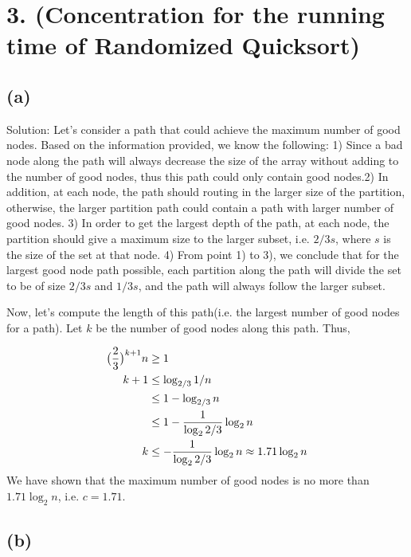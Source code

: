 \documentclass[11pt]{537homework}
\author{Peilun Dai}
\begin{document}
\section*{3. (Concentration for the running time of Randomized Quicksort) }



\subsection*{(a)}

Solution: Let's consider a path that could achieve the maximum number of good nodes. Based on the information provided, we know the following: 1) Since a bad node along the path will always decrease the size of the array without adding to the number of good nodes, thus this path could only contain good nodes.2) In addition, at each node, the path should routing in the larger size of the partition, otherwise, the larger partition path could contain a path with larger number of good nodes. 3) In order to get the largest depth of the path, at each node, the partition should give a maximum size to the larger subset, i.e. $2/3s$, where $s$ is the size of the set at that node. 4) From point 1) to 3), we conclude that for the largest good node path possible, each partition along the path will divide the set to be of size $2/3s$ and $1/3s$, and the path will always follow the larger subset. 

Now, let's compute the length of this path(i.e. the largest number of good nodes for a path). Let $k$ be the number of good nodes along this path. Thus,

\begin{align}
  \big( {2 \over 3} \big)^{k+1}n & \geq 1 \\
                k + 1            & \leq \log_{2/3}{1/n}\\
                                & \leq 1 - \log_{2/3}n \\
                                & \leq 1 - {1 \over \log_{2}2/3}\log_2{n} \\
                            k & \leq  - {1 \over \log_{2}2/3}\log_2{n} \approx 1.71 \log_2{n} 
\end{align}
We have shown that the maximum number of good nodes is no more than $1.71 \log_2{n}$, i.e. $c=1.71$.


\subsection*{(b)}
\end{document}
